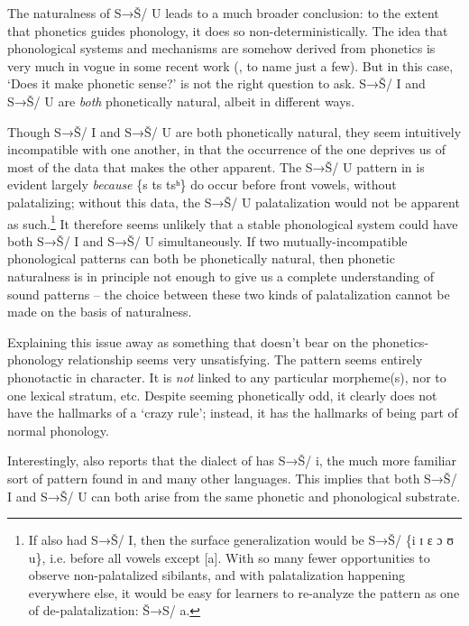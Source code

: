 The naturalness of S→Š/ {\longrule} U leads to a much broader conclusion: to the extent that phonetics guides phonology, it does so non-deterministically. The idea that phonological systems and mechanisms are somehow derived from phonetics is very much in vogue in some recent work (\citealt{Ohala1981,Ohala1990,Ohala:2004aa,Hayes1999,Steriade2008,Kawahara2008}, to name just a few). But in this case, ‘Does it make phonetic sense?’ is not the right question to ask. S→Š/ {\longrule} I and S→Š/ {\longrule} U are \textit{both} phonetically natural, albeit in different ways.

Though S→Š/ {\longrule} I and S→Š/ {\longrule} U are both phonetically natural, they seem intuitively incompatible with one another, in that the occurrence of the one deprives us of most of the data that makes the other apparent. The S→Š/ {\longrule} U pattern in  is evident largely \textit{because} \{s ts tsʰ\} do occur before front vowels, without palatalizing; without this data, the S→Š/ {\longrule} U palatalization would not be apparent as such.\footnote{If  also had S→Š/ {\longrule} I, then the surface generalization would be S→Š/ {\longrule} \{i ɪ ɛ ɔ ʊ u\}, i.e. before all vowels except [a]. With so many fewer opportunities to observe non-palatalized sibilants, and with palatalization happening everywhere else, it would be easy for learners to re-analyze the pattern as one of de-palatalization: Š→S/ {\longrule} a.} It therefore seems unlikely that a stable phonological system could have both S→Š/ {\longrule} I and S→Š/ {\longrule} U simultaneously. If two mutually-incompatible phonological patterns can both be phonetically natural, then phonetic naturalness is in principle not enough to give us a complete understanding of sound patterns – the choice between these two kinds of palatalization cannot be made on the basis of naturalness.

Explaining this issue away as something that doesn’t bear on the phonetics-phonology relationship seems very unsatisfying. The  pattern seems entirely phonotactic in character. It is \textit{not} linked to any particular morpheme(s), nor to one lexical stratum, etc. Despite seeming phonetically odd, it clearly does not have the hallmarks of a ‘crazy rule’; instead, it has the hallmarks of being part of normal phonology. 

Interestingly, \citet{Malepe1966} also reports that the  dialect of  has S→Š/ {\longrule} i, the much more familiar sort of pattern found in  and many other languages. This implies that both S→Š/ {\longrule} I and S→Š/ {\longrule} U can both arise from the same phonetic and phonological substrate. 

